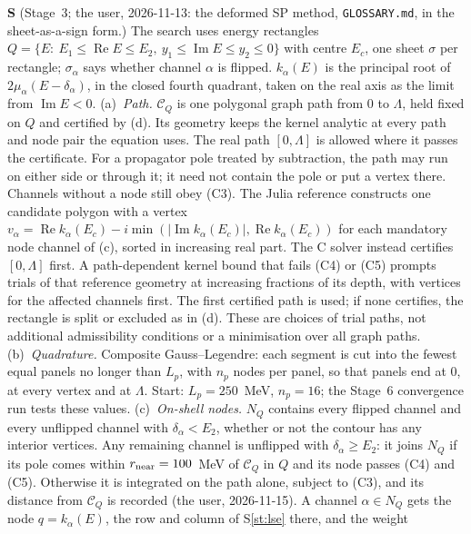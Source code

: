 \documentclass[11pt]{article}
\newcommand{\file}[1]{\nolinkurl{#1}}
\newcounter{stmt}
\newenvironment{stmt}[1]{\par\smallskip\refstepcounter{stmt}\noindent\textbf{S\thestmt}\enspace[\textsf{#1}]\enspace\ignorespaces}{\par\smallskip}
\newcommand{\Sr}[1]{S\ref{#1}}
\begin{document}
\begin{stmt}{definition}\label{st:shape}
(Stage~3; the user, 2026-11-13: the deformed SP method, \file{GLOSSARY.md}, in the sheet-as-a-sign form.) The search uses energy rectangles $Q=\{E:\ E_1\le\operatorname{Re}E\le E_2,\ y_1\le\operatorname{Im}E\le y_2\le0\}$ with centre $E_c$, one sheet $\sigma$ per rectangle; $\sigma_\alpha$ says whether channel $\alpha$ is flipped. $k_\alpha(E)$ is the principal root of $2\mu_\alpha(E-\delta_\alpha)$, in the closed fourth quadrant, taken on the real axis as the limit from $\operatorname{Im}E<0$.
(a)~\emph{Path.} $\mathcal C_Q$ is one polygonal graph path from $0$ to $\Lambda$, held fixed on $Q$ and certified by (d). Its geometry keeps the kernel analytic at every path and node pair the equation uses. The real path $[0,\Lambda]$ is allowed where it passes the certificate. For a propagator pole treated by subtraction, the path may run on either side or through it; it need not contain the pole or put a vertex there. Channels without a node still obey (C3).
The Julia reference constructs one candidate polygon with a vertex $v_\alpha=\operatorname{Re}k_\alpha(E_c)-i\min(|\operatorname{Im}k_\alpha(E_c)|,\operatorname{Re}k_\alpha(E_c))$ for each mandatory node channel of (c), sorted in increasing real part. The C solver instead certifies $[0,\Lambda]$ first. A path-dependent kernel bound that fails (C4) or (C5) prompts trials of that reference geometry at increasing fractions of its depth, with vertices for the affected channels first. The first certified path is used; if none certifies, the rectangle is split or excluded as in (d). These are choices of trial paths, not additional admissibility conditions or a minimisation over all graph paths.
(b)~\emph{Quadrature.} Composite Gauss--Legendre: each segment is cut into the fewest equal panels no longer than $L_p$, with $n_p$ nodes per panel, so that panels end at $0$, at every vertex and at $\Lambda$. Start: $L_p=250$~MeV, $n_p=16$; the Stage~6 convergence run tests these values.
(c)~\emph{On-shell nodes.} $N_Q$ contains every flipped channel and every unflipped channel with $\delta_\alpha<E_2$, whether or not the contour has any interior vertices. Any remaining channel is unflipped with $\delta_\alpha\ge E_2$: it joins $N_Q$ if its pole comes within $r_{\rm near}=100$~MeV of $\mathcal C_Q$ in $Q$ and its node passes (C4) and (C5). Otherwise it is integrated on the path alone, subject to (C3), and its distance from $\mathcal C_Q$ is recorded (the user, 2026-11-15). A channel $\alpha\in N_Q$ gets the node $q=k_\alpha(E)$, the row and column of \Sr{st:lse} there, and the weight

\end{stmt}
\end{document}
